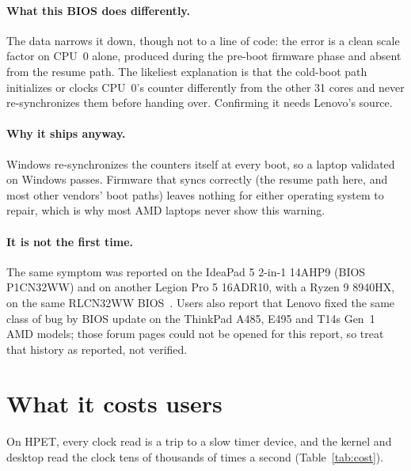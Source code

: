 \documentclass[11pt,a4paper]{article}
\begin{document}
\paragraph{What this BIOS does differently.} The data narrows it down, though
not to a line of code: the error is a clean scale factor on CPU~0 alone,
produced during the pre-boot firmware phase and absent from the resume path.
The likeliest explanation is that the cold-boot path initializes or clocks
CPU~0's counter differently from the other 31 cores and never re-synchronizes
them before handing over. Confirming it needs Lenovo's source.

\paragraph{Why it ships anyway.} Windows re-synchronizes the counters itself
at every boot, so a laptop validated on Windows passes. Firmware that syncs
correctly (the resume path here, and most other vendors' boot paths) leaves
nothing for either operating system to repair, which is why most AMD laptops
never show this warning.

\paragraph{It is not the first time.} The same symptom was reported on the
IdeaPad 5 2-in-1 14AHP9 (BIOS P1CN32WW) and on another Legion Pro 5 16ADR10,
with a Ryzen 9 8940HX, on the same RLCN32WW BIOS~\cite{lenovo-forum}. Users
also report that Lenovo fixed the same class of bug by BIOS update on the
ThinkPad A485, E495 and T14s Gen~1 AMD models; those forum pages could not be
opened for this report, so treat that history as reported, not verified.

\section{What it costs users}

On HPET, every clock read is a trip to a slow timer device, and the kernel
and desktop read the clock tens of thousands of times a second
(Table~\ref{tab:cost}).
\end{document}
